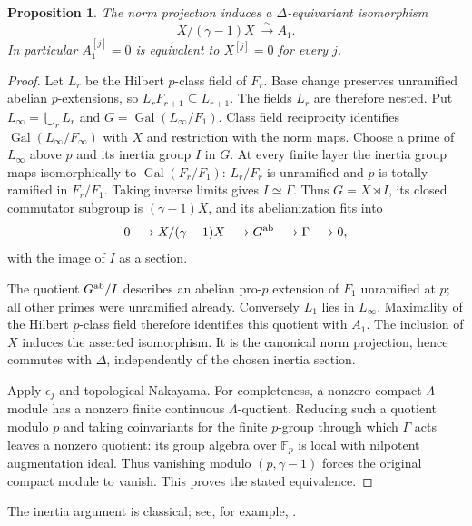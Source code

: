 \documentclass[11pt]{article}
\newtheorem{proposition}[theorem]{Proposition}
\theoremstyle{definition}\newtheorem{definition}[theorem]{Definition}
\newcommand{\F}{\mathbb F}\newcommand{\Gal}{\operatorname{Gal}}
\begin{document}
\begin{proposition}\label{prop:component-control}
The norm projection induces a $\Delta$-equivariant isomorphism
\[
 X/(\gamma-1)X\ \xrightarrow{\ \sim\ } A_1.
\]
In particular $A_1^{[j]}=0$ is equivalent to $X^{[j]}=0$ for every $j$.
\end{proposition}
\begin{proof}
Let $L_r$ be the Hilbert $p$-class field of $F_r$. Base change preserves
unramified abelian $p$-extensions, so $L_rF_{r+1}\subseteq L_{r+1}$.
The fields $L_r$ are therefore nested. Put $L_\infty=\bigcup_rL_r$ and
$G=\Gal(L_\infty/F_1)$. Class field reciprocity identifies
$\Gal(L_\infty/F_\infty)$ with $X$ and restriction with the norm maps.
Choose a prime of $L_\infty$ above $p$ and its inertia group $I$ in $G$.
At every finite layer the inertia group maps isomorphically to
$\Gal(F_r/F_1)$: $L_r/F_r$ is unramified and $p$ is totally ramified
in $F_r/F_1$. Taking inverse limits gives $I\simeq\Gamma$.
Thus $G=X\rtimes I$, its closed commutator subgroup is $(\gamma-1)X$,
and its abelianization fits into
\[
 0\longrightarrow X/(\gamma-1)X\longrightarrow G^{\rm ab}
   \longrightarrow\Gamma\longrightarrow0,
\]
with the image of $I$ as a section.

The quotient $G^{\rm ab}/I$ describes an abelian pro-$p$ extension
of $F_1$ unramified at $p$; all other primes were unramified already.
Conversely $L_1$ lies in $L_\infty$. Maximality of the Hilbert
$p$-class field therefore identifies this quotient with $A_1$.
The inclusion of $X$ induces the asserted isomorphism. It is the
canonical norm projection, hence commutes with $\Delta$, independently
of the chosen inertia section.

Apply $\epsilon_j$ and topological Nakayama. For completeness, a
nonzero compact $\Lambda$-module has a nonzero finite continuous
$\Lambda$-quotient. Reducing such a quotient modulo $p$ and taking
coinvariants for the finite $p$-group through which $\Gamma$ acts
leaves a nonzero quotient: its group algebra over $\F_p$ is local
with nilpotent augmentation ideal. Thus vanishing modulo
$(p,\gamma-1)$ forces the original compact module to vanish.
This proves the stated equivalence.
\end{proof}
The inertia argument is classical; see, for example,
\cite[\S1.3, pp.~3--4]{Wuthrich}.
\end{document}
